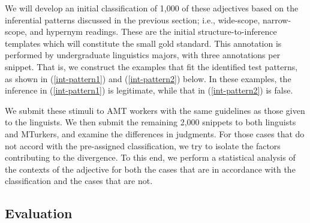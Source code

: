 \documentclass[10pt]{article}
\begin{document}
We will develop an initial classification of 1,000 of these adjectives based on the inferential patterns discussed in the previous section; i.e., wide-scope, narrow-scope, and hypernym readings. 
These are the initial structure-to-inference templates which will constitute the small gold standard. This annotation is performed by undergraduate linguistics majors, with three annotations per snippet. 
That is, we construct the examples that fit the identified test patterns, as shown in (\ref{int-pattern1}) and (\ref{int-pattern2}) below. In these examples, the inference in (\ref{int-pattern1}) is legitimate, while that in (\ref{int-pattern2}) is false. 

\vspace {-3mm}

\begin{multicols}{2}

\vspace {-6mm}

\end{multicols}
\vspace {-2mm}

 \noindent We submit these stimuli to AMT workers with the same guidelines as those given to the linguists. 
 We then submit the remaining 2,000 snippets to both linguists and MTurkers, and examine the differences in judgments. For those cases that do not accord with the pre-assigned classification, we try to isolate the factors contributing to the divergence. 
 To this end, we perform a statistical analysis of the contexts of the adjective for both the cases that are in accordance with the classification and the cases that are not. 
 

\vspace {-3mm}

\subsection{Evaluation}

\vspace {-3mm}
\end{document}
